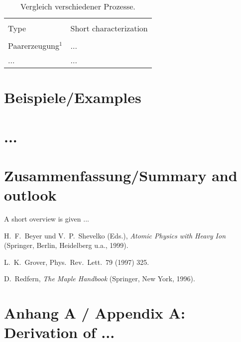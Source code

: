\documentclass[11pt]{article}
\begin{document}
%
%
%
%
%
%
\begin{table}
\begin{small}
\caption{\rm Vergleich verschiedener Prozesse.}
\label{vortex-beams}
\begin{center}
\begin{tabular}{p{6.7cm} p{7.8cm}}
   \\[-0.4cm] \hline \hline \\[-0.4cm]
   Type  & Short characterization
   \\[0.1cm]  \hline  \\[-0.25cm]
   Paarerzeugung$^1$ & ...  \\[0.1cm]
   ...               & ...  \\[0.1cm]
   \hline \hline
\end{tabular}
\end{center}
\vspace{0.2cm}
\end{small}
\end{table}


%
%
%
%
%
\section{Beispiele/Examples}  


%
%
%
%
%
\section{...}  


%
%
%
%
%
\section{Zusammenfassung/Summary and outlook}  \label{sec_outlook}

A short overview is given ...


%
%
%
%
%
\begin{thebibliography}{99}

   H.~F.~Beyer und V.~P.~Shevelko (Eds.), \textit{Atomic Physics with Heavy Ion} (Springer, Berlin, Heidelberg u.a., 1999).

   L.~K.~Grover, Phys.\ Rev.\ Lett.\ 79 (1997) 325.

   D.~Redfern, \textit{The Maple Handbook} (Springer, New York, 1996).

\end{thebibliography}








\newpage
%
%
%
%
%

\appendix

\section*{Anhang A / Appendix A: \hspace{0.02cm} Derivation of ...}
\end{document}
